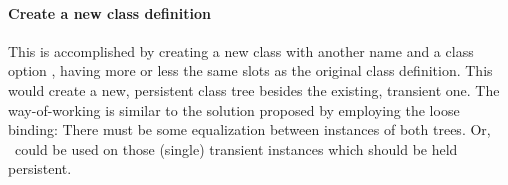 \paragraph{Create a new class definition} This is accomplished by
creating a new class with another name and a class option
, having more or less the same
slots as the original class definition.  This would create a new,
persistent class tree besides the existing, transient one. The
way-of-working is similar to the solution proposed by employing the
loose binding: There must be some equalization between instances of
both trees. Or, \ could be used on those (single)
transient instances which should be held persistent.

